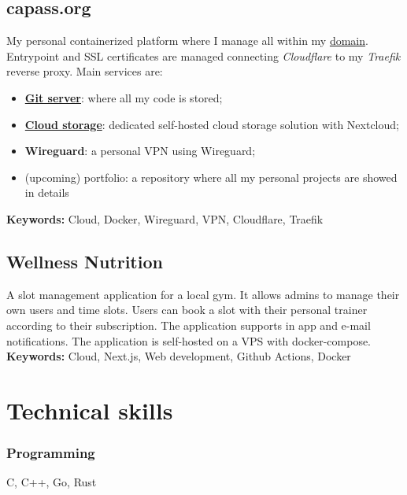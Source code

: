 \documentclass[11pt,a4paper]{article}
\begin{document}
  \subsection{capass.org \href{https://github.com/alarmfox/personal-cloud}{\faGithub} \href{https://git.capass.org}{\faGit} \href{https://cloud.capass.org}{\faCloud}}
  My personal containerized platform where I manage all within my \href{https://capass.org}{domain}. Entrypoint and SSL certificates are managed connecting \textit{Cloudflare} to my \textit{Traefik} reverse proxy. Main services are:
  \begin{itemize}
    \item \href{https://git.capass.org}{\textbf{Git server}}: where all my code is stored;
    \item \href{https://cloud.capass.org}{\textbf{Cloud storage}}: dedicated self-hosted cloud storage solution with Nextcloud;
    \item \textbf{Wireguard}: a personal VPN using Wireguard;
    \item (upcoming) portfolio: a repository where all my personal projects are showed in details
  \end{itemize}

  \textbf{Keywords:} Cloud, Docker, Wireguard, VPN, Cloudflare, Traefik

  \subsection{Wellness Nutrition \href{https://github.com/alarmfox/wellness-nutrition}{\faGithub} \href{https://wellnessdemo.capass.org}{\faLaptopCode}}
  A slot management application for a local gym. It allows admins to manage their own users and time slots. Users can book a slot with their personal trainer according to their subscription. The application supports in app and e-mail notifications. The application is self-hosted on a VPS with docker-compose.\\

  \textbf{Keywords:} Cloud, Next.js, Web development, Github Actions, Docker

  \section{Technical skills}
  \subsubsection{Programming}
  C, C++, Go, Rust
\end{document}
